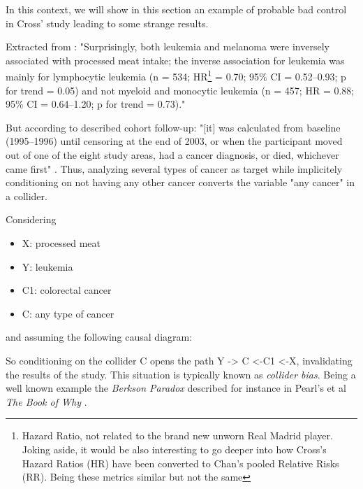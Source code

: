 \documentclass{article}
\begin{document}
In this context, we will show in this section an example of probable bad control in Cross' study leading to some strange results.

Extracted from \cite{cross}: "Surprisingly, both leukemia and melanoma were inversely associated with processed meat intake; the inverse association for leukemia was mainly for lymphocytic leukemia (n = 534; HR\footnote{Hazard Ratio, not related to the brand new unworn Real Madrid player. Joking aside, it would be also interesting to go deeper into how Cross's Hazard Ratios (HR) have been converted to Chan's pooled Relative Risks (RR). Being these metrics similar but not the same} = 0.70; 95\% CI = 0.52–0.93; p for trend = 0.05) and not myeloid and monocytic leukemia (n = 457; HR = 0.88; 95\% CI = 0.64–1.20; p for trend = 0.73)."

But according to described cohort follow-up: "[it] was calculated from baseline (1995–1996) until censoring at the end of 2003, or when the participant moved out of one of the eight study areas, had a cancer diagnosis, or died, whichever came first" \cite{cross}. Thus, analyzing several types of cancer as target while implicitely conditioning on not having any other cancer converts the variable "any cancer" in a collider.

Considering
\begin{itemize}
\item X: processed meat
\item Y: leukemia
\item C1: colorectal cancer
\item C: any type of cancer
\end{itemize}

and assuming the following causal diagram:


So conditioning on the collider C opens the path Y -> C <-C1 <-X, invalidating the results of the study. This situation is typically known as \textit{collider bias}. Being a well known example the \textit{Berkson Paradox} described for instance in Pearl's et al \textit{The Book of Why} \cite{bookofwhy}.
\end{document}
